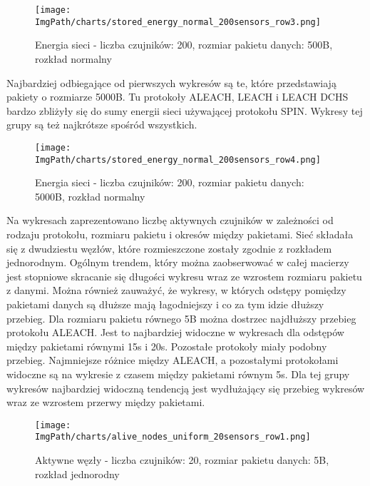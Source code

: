 \begin{figure}[H]
	\begin{center}
		\texttt{[image: \\ImgPath/charts/stored\_energy\_normal\_200sensors\_row3.png]}
	\end{center}
	\caption{Energia sieci - liczba czujników: 200, rozmiar pakietu danych: 500B, rozkład normalny}
\end{figure}

Najbardziej odbiegające od pierwszych wykresów są te, które przedstawiają pakiety o rozmiarze 5000B. Tu protokoły ALEACH, LEACH i LEACH DCHS bardzo zbliżyły się do sumy energii sieci używającej protokołu SPIN. Wykresy tej grupy są też najkrótsze spośród wszystkich.

\begin{figure}[H]
	\begin{center}
		\texttt{[image: \\ImgPath/charts/stored\_energy\_normal\_200sensors\_row4.png]}
	\end{center}
	\caption{Energia sieci - liczba czujników: 200, rozmiar pakietu danych: 5000B, rozkład normalny}
\end{figure}

Na wykresach zaprezentowano liczbę aktywnych czujników w zależności od rodzaju protokołu, rozmiaru pakietu i okresów między pakietami. Sieć składała się z dwudziestu węzłów, które rozmieszczone zostały zgodnie z rozkładem jednorodnym.
Ogólnym trendem, który można zaobserwować w całej macierzy jest stopniowe skracanie się długości wykresu wraz ze wzrostem rozmiaru pakietu z danymi. Można również zauważyć, że wykresy, w których odstępy pomiędzy pakietami danych są dłuższe mają łagodniejszy i co za tym idzie dłuższy przebieg.
Dla rozmiaru pakietu równego 5B można dostrzec najdłuższy przebieg protokołu ALEACH. Jest to najbardziej widoczne w wykresach dla odstępów między pakietami równymi 15s i 20s. Pozostałe protokoły miały podobny przebieg. Najmniejsze różnice między ALEACH, a pozostałymi protokołami widoczne są na wykresie z czasem między pakietami równym 5s. Dla tej grupy wykresów najbardziej widoczną tendencją jest wydłużający się przebieg wykresów wraz ze wzrostem przerwy między pakietami. 

\begin{figure}[H]
	\begin{center}
		\texttt{[image: \\ImgPath/charts/alive\_nodes\_uniform\_20sensors\_row1.png]}
	\end{center}
	\caption{Aktywne węzły - liczba czujników: 20, rozmiar pakietu danych: 5B, rozkład jednorodny}
\end{figure}

